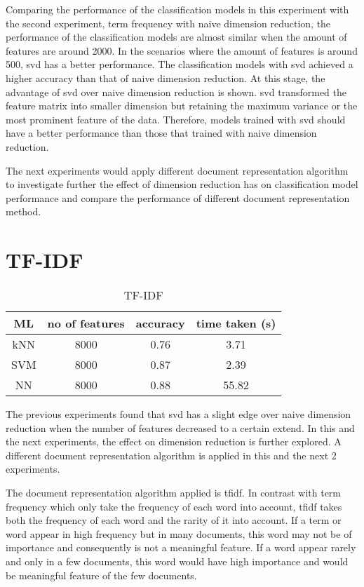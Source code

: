 Comparing the performance of the classification models in this experiment with the second experiment, term frequency with naive dimension reduction, the performance of the classification models are almost similar when the amount of features are around 2000. In the scenarios where the amount of features is around 500, \ac{svd} has a better performance. The classification models with \ac{svd} achieved a higher accuracy than that of naive dimension reduction. At this stage, the advantage of \ac{svd} over naive dimension reduction is shown. \Ac{svd} transformed the feature matrix into smaller dimension but retaining the maximum variance or the most prominent feature of the data. Therefore, models trained with \ac{svd} should have a better performance than those that trained with naive dimension reduction.

The next experiments would apply different document representation algorithm to investigate further the effect of dimension reduction has on classification model performance and compare the performance of different document representation method.\\

\clearpage
\section{TF-IDF}

\begin{table} [ht]
	\centering
	\begin{tabular}{|| c | c | c | c||}
		\hline
		ML & no of features & accuracy & time taken (s) \\ [0.5ex]
		\hline\hline
		kNN & 8000 & 0.76 & 3.71 \\ 
		\hline
		SVM & 8000 & 0.87 & 2.39 \\
		\hline
		NN & 8000 & 0.88 & 55.82 \\
		\hline
	\end{tabular}
\caption{TF-IDF}
\label{tbl:tfidf}
\end{table}

The previous experiments found that \ac{svd} has a slight edge over naive dimension reduction when the number of features decreased to a certain extend. In this and the next experiments, the effect on dimension reduction is further explored. A different document representation algorithm is applied in this and the next 2 experiments.
 
The document representation algorithm applied is \ac{tfidf}. In contrast with term frequency which only take the frequency of each word into account, \ac{tfidf} takes both the frequency of each word and the rarity of it into account. If a term or word appear in high frequency but in many documents, this word may not be of importance and consequently is not a meaningful feature. If a word appear rarely and only in a few documents, this word would have high importance and would be meaningful feature of the few documents.

